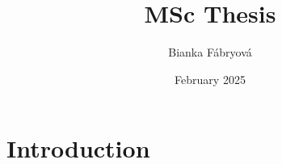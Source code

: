 \documentclass{article}
\title{MSc Thesis}
\author{Bianka Fábryová}
\date{February 2025}
\begin{document}
\maketitle

\section{Introduction}
\end{document}
